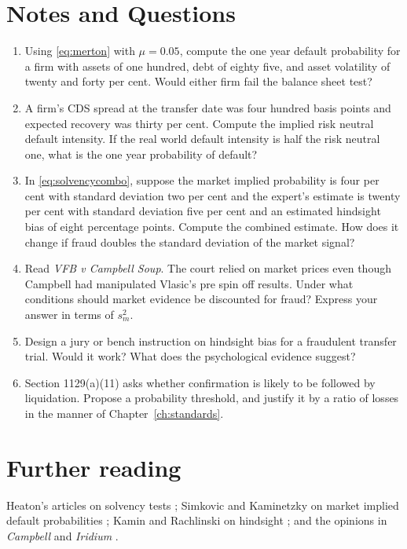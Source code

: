 \section*{Notes and Questions}
\begin{enumerate}[label=\arabic*.]
\item Using \eqref{eq:merton} with $\mu = 0.05$, compute the one year default probability for a firm with assets of one hundred, debt of eighty five, and asset volatility of twenty and forty per cent. Would either firm fail the balance sheet test?
\item A firm's CDS spread at the transfer date was four hundred basis points and expected recovery was thirty per cent. Compute the implied risk neutral default intensity. If the real world default intensity is half the risk neutral one, what is the one year probability of default?
\item In \eqref{eq:solvencycombo}, suppose the market implied probability is four per cent with standard deviation two per cent and the expert's estimate is twenty per cent with standard deviation five per cent and an estimated hindsight bias of eight percentage points. Compute the combined estimate. How does it change if fraud doubles the standard deviation of the market signal?
\item Read \emph{VFB v Campbell Soup}. The court relied on market prices even though Campbell had manipulated Vlasic's pre spin off results. Under what conditions should market evidence be discounted for fraud? Express your answer in terms of $s_m^2$.
\item Design a jury or bench instruction on hindsight bias for a fraudulent transfer trial. Would it work? What does the psychological evidence suggest?
\item Section 1129(a)(11) asks whether confirmation is likely to be followed by liquidation. Propose a probability threshold, and justify it by a ratio of losses in the manner of Chapter~\ref{ch:standards}.
\end{enumerate}

\section*{Further reading}
Heaton's articles on solvency tests \citep{heaton2002,heaton2007}; Simkovic and Kaminetzky on market implied default probabilities \citep{simkovic2011}; Kamin and Rachlinski on hindsight \citep{kamin1995}; and the opinions in \emph{Campbell} and \emph{Iridium} \citep{vfb2007,iridium2007}.
